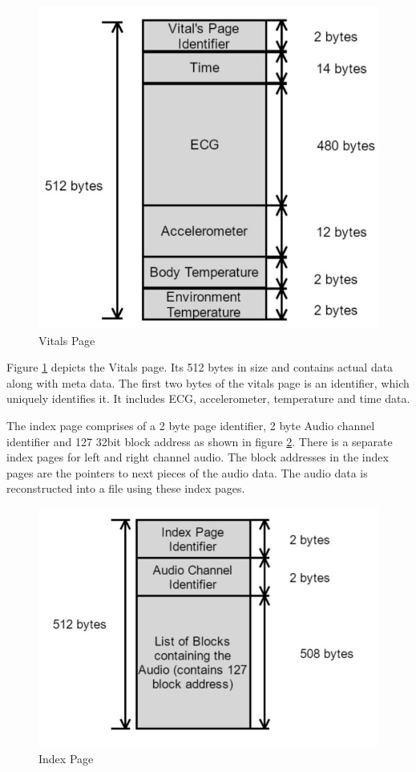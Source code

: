 \begin{figure}[h]
	\centering
	\includegraphics[scale = 0.5 ]{vital_page.JPG}
	\caption{Vitals Page\label{vital_page}}
\end{figure}


\hspace{10mm}Figure \ref{vital_page} depicts the Vitals page. Its 512 bytes in size and contains actual data along with meta data. The first two bytes of the vitals page is an identifier, which uniquely identifies it. It includes ECG, accelerometer, temperature and time data. 


 \hspace{10mm}The index page comprises of a 2 byte page identifier, 2 byte Audio channel identifier and 127 32bit block address as shown in figure \ref{index_page}. There is a separate index pages for left and right channel audio. The block addresses in the index pages are the pointers to next pieces of the audio data. The audio data is reconstructed into a file using these index pages.
 
\begin{figure}[h]
	\centering
	\includegraphics[scale = 0.5 ]{index_page.JPG}
	\caption{Index Page\label{index_page}}
\end{figure}

